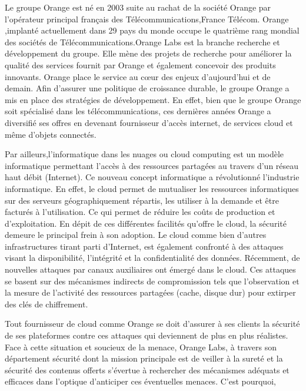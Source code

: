 Le groupe Orange est né en 2003 suite au  rachat de la société Orange par l'opérateur principal français des Télécommunications,France Télécom. Orange ,implanté actuellement dans 29 pays du monde occupe le quatrième rang mondial des sociétés de Télécommunications.Orange Labs est la branche recherche et développement du groupe. Elle mène des projets de recherche pour améliorer la qualité des services fournit par Orange et également concevoir des produits innovants. Orange place le service au cœur des enjeux d'aujourd'hui et de demain.
Afin  d'assurer une politique de croissance durable, le groupe Orange a mis en place des stratégies de développement. En effet, bien que le groupe Orange soit spécialisé dans les télécommunications, ces dernières années Orange a diversifié ses offres en devenant fournisseur d'accès internet, de services cloud et même d'objets connectés. \newline{}
\newline
\par 
Par ailleurs,l'informatique dans les nuages ou cloud computing est un modèle  informatique permettant  l'accès à des ressources partagées au travers d'un réseau haut débit (Internet). Ce nouveau concept informatique a révolutionné l'industrie informatique.  En effet, le cloud permet de  mutualiser les ressources informatiques sur des serveurs géographiquement répartis, les utiliser à la demande et être facturés à l'utilisation. Ce qui permet de réduire les coûts de production et d'exploitation. En dépit de ces différentes facilités qu'offre le  cloud, la sécurité demeure  le principal  frein  à son  adoption.  Le cloud comme bien d'autres infrastructures tirant parti d'Internet, est également confronté à des attaques visant la disponibilité, l'intégrité et la confidentialité des données. Récemment, de nouvelles attaques  par  canaux auxiliaires  ont émergé dans le cloud. Ces attaques se basent sur des mécanismes indirects de compromission  tels que l'observation  et la mesure de l'activité des ressources partagées (cache, disque dur)  pour extirper des clés de chiffrement. \newline{}
\newline
\par 
Tout fournisseur de cloud comme Orange se doit d'assurer à ses clients la sécurité de ses plateformes contre ces attaques qui deviennent de plus en plus réalistes.
Face à cette situation et soucieux de la menace,  Orange Labs,  à travers  son département sécurité dont la mission  principale est  de veiller à la sureté et la sécurité des contenus offerts s’évertue à rechercher des mécanismes adéquats  et efficaces dans l’optique d’anticiper ces éventuelles menaces. C’est pourquoi,
